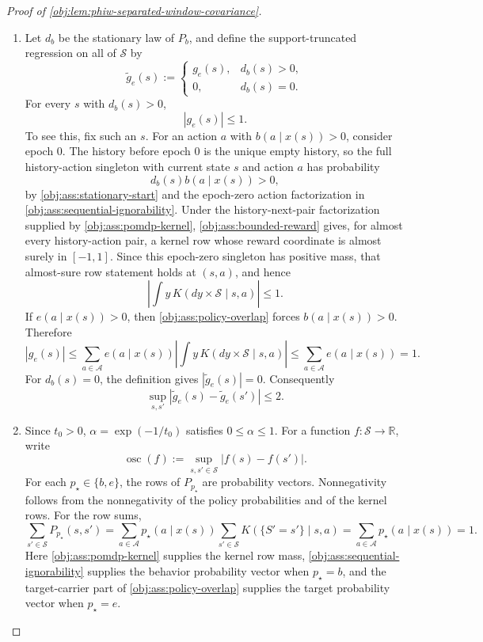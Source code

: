\documentclass[11pt]{article}
\begin{document}
\begin{proof}[Proof of \cref{obj:lem:phiw-separated-window-covariance}]
\begin{enumerate}
\item Let \(d_b\) be the stationary law of \(P_b\), and define the support-truncated regression on all of \(\mathcal S\) by
\[
\widetilde g_e(s):=
\begin{cases}
g_e(s),& d_b(s)>0,\\
0,& d_b(s)=0.
\end{cases}
\]
For every \(s\) with \(d_b(s)>0\),
\[
|g_e(s)|\le 1 .
\]
To see this, fix such an \(s\). For an action \(a\) with \(b(a\mid x(s))>0\), consider epoch \(0\). The history before epoch \(0\) is the unique empty history, so the full history-action singleton with current state \(s\) and action \(a\) has probability
\[
d_b(s)b(a\mid x(s))>0,
\]
by \cref{obj:ass:stationary-start} and the epoch-zero action factorization in \cref{obj:ass:sequential-ignorability}. Under the history-next-pair factorization supplied by \cref{obj:ass:pomdp-kernel}, \cref{obj:ass:bounded-reward} gives, for almost every history-action pair, a kernel row whose reward coordinate is almost surely in \([-1,1]\). Since this epoch-zero singleton has positive mass, that almost-sure row statement holds at \((s,a)\), and hence
\[
\left|\int y\,K(dy\times\mathcal S\mid s,a)\right|\le 1 .
\]
If \(e(a\mid x(s))>0\), then \cref{obj:ass:policy-overlap} forces \(b(a\mid x(s))>0\). Therefore
\[
|g_e(s)|
\le
\sum_{a\in\mathcal A} e(a\mid x(s))
\left|\int y\,K(dy\times\mathcal S\mid s,a)\right|
\le
\sum_{a\in\mathcal A} e(a\mid x(s))
=1.
\]
For \(d_b(s)=0\), the definition gives \(|\widetilde g_e(s)|=0\). Consequently
\[
\sup_{s,s'}|\widetilde g_e(s)-\widetilde g_e(s')|\le 2 .
\] %

\item Since \(t_0>0\), \(\alpha=\exp(-1/t_0)\) satisfies \(0\le \alpha\le 1\). For a function \(f:\mathcal S\to\mathbb R\), write
\[
\operatorname{osc}(f):=\sup_{s,s'\in\mathcal S}|f(s)-f(s')|.
\]
For each \(p_\star\in\{b,e\}\), the rows of \(P_{p_\star}\) are probability vectors. Nonnegativity follows from the nonnegativity of the policy probabilities and of the kernel rows. For the row sums,
\[
\sum_{s'\in\mathcal S}P_{p_\star}(s,s')
=
\sum_{a\in\mathcal A}p_\star(a\mid x(s))
   \sum_{s'\in\mathcal S}K(\{S'=s'\}\mid s,a)
=
\sum_{a\in\mathcal A}p_\star(a\mid x(s))
=1.
\]
Here \cref{obj:ass:pomdp-kernel} supplies the kernel row mass, \cref{obj:ass:sequential-ignorability} supplies the behavior probability vector when \(p_\star=b\), and the target-carrier part of \cref{obj:ass:policy-overlap} supplies the target probability vector when \(p_\star=e\).


\end{enumerate}
\end{proof}
\end{document}
